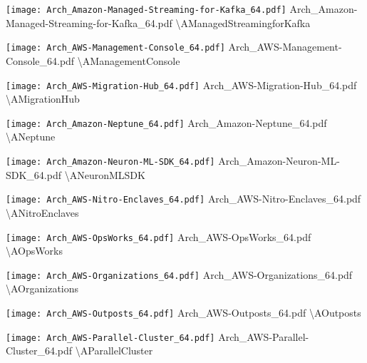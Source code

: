  {\texttt{[image: Arch\_Amazon-Managed-Streaming-for-Kafka\_64.pdf]}} {Arch\_Amazon-Managed-Streaming-for-Kafka\_64.pdf} {{\textbackslash}AManagedStreamingforKafka}

 {\texttt{[image: Arch\_AWS-Management-Console\_64.pdf]}} {Arch\_AWS-Management-Console\_64.pdf} {{\textbackslash}AManagementConsole}

 {\texttt{[image: Arch\_AWS-Migration-Hub\_64.pdf]}} {Arch\_AWS-Migration-Hub\_64.pdf} {{\textbackslash}AMigrationHub}

 {\texttt{[image: Arch\_Amazon-Neptune\_64.pdf]}} {Arch\_Amazon-Neptune\_64.pdf} {{\textbackslash}ANeptune}

 {\texttt{[image: Arch\_Amazon-Neuron-ML-SDK\_64.pdf]}} {Arch\_Amazon-Neuron-ML-SDK\_64.pdf} {{\textbackslash}ANeuronMLSDK}

 {\texttt{[image: Arch\_AWS-Nitro-Enclaves\_64.pdf]}} {Arch\_AWS-Nitro-Enclaves\_64.pdf} {{\textbackslash}ANitroEnclaves}

 {\texttt{[image: Arch\_AWS-OpsWorks\_64.pdf]}} {Arch\_AWS-OpsWorks\_64.pdf} {{\textbackslash}AOpsWorks}

 {\texttt{[image: Arch\_AWS-Organizations\_64.pdf]}} {Arch\_AWS-Organizations\_64.pdf} {{\textbackslash}AOrganizations}

 {\texttt{[image: Arch\_AWS-Outposts\_64.pdf]}} {Arch\_AWS-Outposts\_64.pdf} {{\textbackslash}AOutposts}

 {\texttt{[image: Arch\_AWS-Parallel-Cluster\_64.pdf]}} {Arch\_AWS-Parallel-Cluster\_64.pdf} {{\textbackslash}AParallelCluster}

